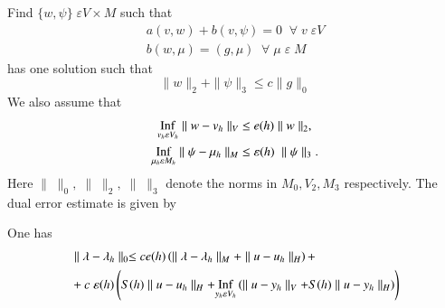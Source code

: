 Find $\{w,\psi\}\;\varepsilon V\times M$ such that 
\begin{align*}
a(v,w)+b(v,\psi)=0\; \; \forall \;v\;\varepsilon
V\tag{7.48} \label{chap7:eq7.48}\\
b(w,\mu)=(g,\mu)\; \; \forall \;\mu \;\varepsilon \;M
\tag{7.48b}\label{chap7:eq7.48b} 
\end{align*}
has one solution such that 
\setcounter{equation}{48}
\begin{equation}\label{chap7:eq7.49}
\parallel w\parallel_2+\parallel\psi\parallel_3\leq c\parallel
g\parallel_0 
\end{equation}
We also assume that 
\begin{align}
\underset{v_h\varepsilon V_h}{\operatorname{Inf}}\parallel w-v_h\parallel_V &\leq
e(h) \parallel w\parallel_2, \label{chap7:eq7.50}\\
\underset{\mu_h\varepsilon M_h}{\operatorname{Inf}}\parallel\psi-\mu_h \parallel_M
&\leq \varepsilon(h)\;\parallel\psi\parallel_3. \label{chap7:eq7.51} 
\end{align}
Here $\parallel \;\parallel_0, \;\parallel \;\parallel_2, \;\parallel
\;\parallel_3$ denote the norms in $M_0, V_2, M_3$ respectively. The
dual error estimate is given by 

\setcounter{THM}{9}
\begin{THM}\label{chap7:THM10}
One has 
\begin{equation}\label{chap7:eq7.52}
\begin{split}
&\parallel\lambda-\lambda_h\parallel_0\leq ce(h)\left(\parallel\lambda-
\lambda_h\parallel_M+\parallel u-u_h\parallel_H\right)+\\
&+c\;\varepsilon(h)\left(S(h)\parallel u-u_h\parallel_H+
\underset{y_h\varepsilon V_h}{\operatorname{Inf}} \left(\parallel u-y_h\parallel_V+
S(h)\parallel u-y_h\parallel_H\right)\right) 
\end{split}
\end{equation}
\end{THM}

